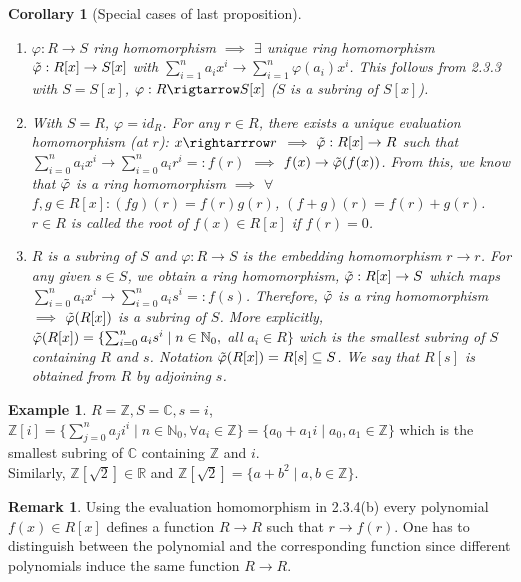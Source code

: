 \documentclass[11pt]{article}
\newtheorem{cor}[thm]{Corollary}
\theoremstyle{definition}
\newtheorem{example}[thm]{Example}
\newtheorem{remark}[thm]{Remark}
\numberwithin{equation}{section}
\newcommand{\R}{\mathbb{R}}  %
\newcommand{\C}{\mathbb{C}}  %
\newcommand{\Z}{\mathbb{Z}}
\newcommand{\N}{\mathbb{N}} %
\begin{document}
\begin{cor}[Special cases of last proposition]
\begin{enumerate}
    \item $\varphi: R \rightarrow S$ ring homomorphism $\implies$ $\exists$ unique ring homomorphism $\Tilde{\varphi}: R[x] \rightarrow S[x]$ with $\sum_{i=1}^{n}a_{i}x^{i} \rightarrow \sum_{i=1}^{n} \varphi(a_{i})x^{i}$. This follows from 2.3.3 with $S = S[x]$, $\varphi: R \rigtarrow S[x]$ ($S$ is a subring of $S[x]$).
    \item With $S = R$, $\varphi = id_{R}$. For any $r \in R$, there exists a unique evaluation homomorphism (at $r$): $x \rightarrrow r$ $\implies$ $\Tilde{\varphi}: R[x] \rightarrow R$ such that $\sum_{i=0}^{n}a_{i}x^{i} \rightarrow \sum_{i=0}^{n}a_{i}r^{i} =: f(r)$ $\implies$ $f(x) \rightarrow \Tilde{\varphi}(f(x))$. From this, we know that $\Tilde{\varphi}$ is a ring homomorphism $\implies$ $\forall$ $f, g \in R[x] : (fg)(r) = f(r)g(r)$, $(f+g)(r) = f(r) + g(r)$. $r \in R$ is called the root of $f(x) \in R[x]$ if $f(r) = 0$.
    \item $R$ is a subring of $S$ and $\varphi: R \rightarrow S$ is the embedding homomorphism $r \rightarrow r$. For any given $s \in S$, we obtain a ring homomorphism, $\Tilde{\varphi}: R[x] \rightarrow S$ which maps $\sum_{i=0}^{n} a_{i}x^{i} \rightarrow \sum_{i=0}^{n}a_{i}s^{i} =: f(s)$. Therefore, $\Tilde{\varphi}$ is a ring homomorphism $\implies$ $\Tilde{\varphi}(R[x])$ is a subring of $S$. More explicitly, $\Tilde{\varphi}(R[x]) = \{\sum_{i=0}^{n} a_{i}s^{i} \mid n \in \N_{0}, $ all $a_{i} \in R \}$ wich is the smallest subring of $S$ containing $R$ and $s$. \textit{Notation} $\Tilde{\varphi}(R[x]) = R[s] \subseteq S$. We say that $R[s]$ is obtained from $R$ by adjoining $s$.
\end{enumerate}
\end{cor}

\begin{example}
$R = \Z, S = \C, s = i$,$\Z[i] = \{\sum_{j=0}^{n} a_{j}i^{i} \mid n \in \N_{0}, \forall a_{i} \in \Z \} = \{a_{0}+a_{1}i \mid a_{0}, a_{1} \in \Z \}$ which is the smallest subring of $\C$ containing $\Z$ and $i$.\\
Similarly, $\Z[\sqrt{2}] \in \R$ and $\Z[\sqrt{2}] = \{a+b^{2} \mid a, b \in \Z \}$.
\end{example}

\begin{remark}
Using the evaluation homomorphism in 2.3.4(b) every polynomial $f(x) \in R[x]$ defines a function $R \rightarrow R$ such that $r \rightarrow f(r)$. One has to distinguish between the polynomial and the corresponding function since different polynomials induce the same function $R \rightarrow R$.
\end{remark}
\end{document}
